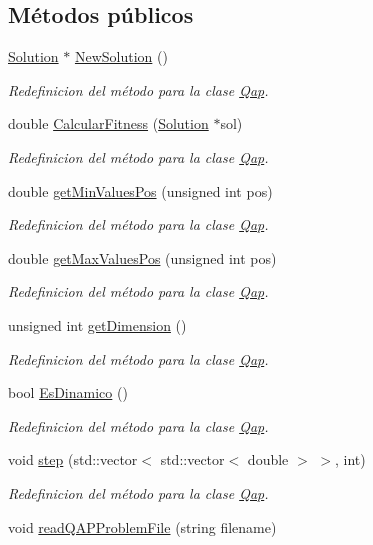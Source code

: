 \subsection*{Métodos públicos}
\begin{DoxyCompactItemize}
\item 
\hyperlink{class_solution}{Solution} $\ast$ \hyperlink{class_qap_a4493347601b4458092eb443ee8499743}{New\+Solution} ()
\begin{DoxyCompactList}\small\item\em Redefinicion del método para la clase \hyperlink{class_qap}{Qap}. \end{DoxyCompactList}\item 
double \hyperlink{class_qap_a05d324d41f7d70c8057b7b35a2f2aeab}{Calcular\+Fitness} (\hyperlink{class_solution}{Solution} $\ast$sol)
\begin{DoxyCompactList}\small\item\em Redefinicion del método para la clase \hyperlink{class_qap}{Qap}. \end{DoxyCompactList}\item 
double \hyperlink{class_qap_a8b736df9c6b69a4f1f2c76921b1d9992}{get\+Min\+Values\+Pos} (unsigned int pos)
\begin{DoxyCompactList}\small\item\em Redefinicion del método para la clase \hyperlink{class_qap}{Qap}. \end{DoxyCompactList}\item 
double \hyperlink{class_qap_ac0d42b8ed406cad3c960505628f4f35c}{get\+Max\+Values\+Pos} (unsigned int pos)
\begin{DoxyCompactList}\small\item\em Redefinicion del método para la clase \hyperlink{class_qap}{Qap}. \end{DoxyCompactList}\item 
unsigned int \hyperlink{class_qap_a82bf0c0567c7e5bbfcef5ec7b4281409}{get\+Dimension} ()
\begin{DoxyCompactList}\small\item\em Redefinicion del método para la clase \hyperlink{class_qap}{Qap}. \end{DoxyCompactList}\item 
bool \hyperlink{class_qap_ac338b0a23c2565cd014a193569a33870}{Es\+Dinamico} ()
\begin{DoxyCompactList}\small\item\em Redefinicion del método para la clase \hyperlink{class_qap}{Qap}. \end{DoxyCompactList}\item 
void \hyperlink{class_qap_a3bb1b7cc62a0f0f0ddd9e2644cea2b7f}{step} (std\+::vector$<$ std\+::vector$<$ double $>$ $>$, int)
\begin{DoxyCompactList}\small\item\em Redefinicion del método para la clase \hyperlink{class_qap}{Qap}. \end{DoxyCompactList}\item 
void \hyperlink{class_qap_a0c90fc0c866ba30a979a8a28e7d95336}{read\+Q\+A\+P\+Problem\+File} (string filename)
\end{DoxyCompactItemize}
